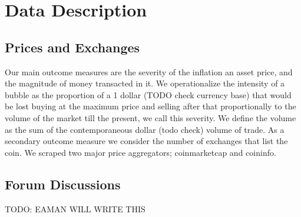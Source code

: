 \section{Data Description}



\subsection{Prices and Exchanges}

Our main outcome measures are the severity of the inflation an asset price, and the magnitude of money transacted in it.
We operationalize the intensity of a bubble as the proportion of a 1 dollar (TODO check currency base) that would be lost buying at the maximum price and selling after that proportionally to the volume of the market till the present, we call this severity.
We define the volume as the sum of the contemporaneous dollar (todo check) volume of trade.
As a secondary outcome measure we consider the number of exchanges that list the coin.
We scraped two major price aggregators; coinmarketcap and coininfo.


\subsection{Forum Discussions}
TODO: EAMAN WILL WRITE THIS

